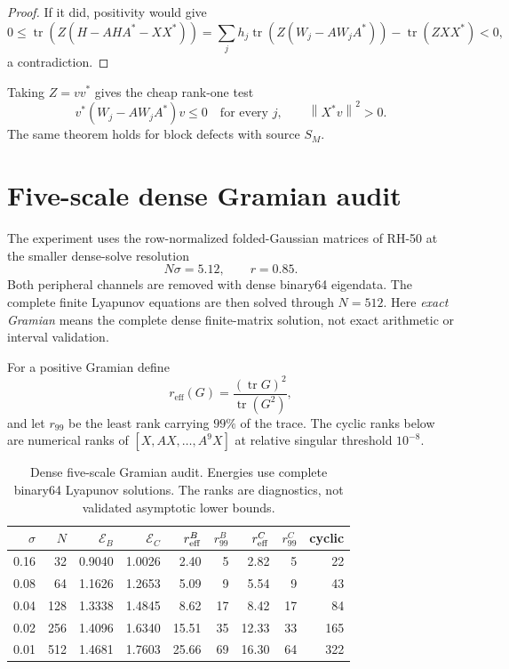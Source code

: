 \documentclass[11pt]{article}
\theoremstyle{definition}
\theoremstyle{remark}
\newcommand{\cE}{\mathcal E}
\newcommand{\tr}{\operatorname{tr}}
\newcommand{\norm}[1]{\left\lVert #1\right\rVert}
\begin{document}
\begin{proof}
If it did, positivity would give
\[
 0\le
 \tr\!\left(Z(H-AHA^*-XX^*)\right)
 =
 \sum_jh_j\tr\!\left(Z(W_j-AW_jA^*)\right)-\tr(ZXX^*)<0,
\]
a contradiction.
\end{proof}

Taking \(Z=vv^*\) gives the cheap rank-one test
\[
 v^*(W_j-AW_jA^*)v\le0\quad\text{for every }j,
 \qquad
 \norm{X^*v}^2>0.
\]
The same theorem holds for block defects with source \(S_M\).

\section{Five-scale dense Gramian audit}

The experiment uses the row-normalized folded-Gaussian matrices of RH-50
at the smaller dense-solve resolution
\[
 N\sigma=5.12,
 \qquad r=0.85.
\]
Both peripheral channels are removed with dense binary64 eigendata.  The
complete finite Lyapunov equations are then solved through \(N=512\).
Here \emph{exact Gramian} means the complete dense finite-matrix solution,
not exact arithmetic or interval validation.

For a positive Gramian define
\[
 r_{\mathrm{eff}}(G)=\frac{(\tr G)^2}{\tr(G^2)},
\]
and let \(r_{99}\) be the least rank carrying \(99\%\) of the trace.  The
cyclic ranks below are numerical ranks of
\([X,AX,\ldots,A^9X]\) at relative singular threshold \(10^{-8}\).

\begin{table}[H]
\centering
\small
\begin{tabular}{@{}rrrrrrrrr@{}}
\toprule
\(\sigma\)&\(N\)&\(\cE_B\)&\(\cE_C\)&\(r_{\rm eff}^B\)&\(r_{99}^B\)&\(r_{\rm eff}^C\)&\(r_{99}^C\)&cyclic\\
\midrule
0.16&32 &0.9040&1.0026&2.40 &5 &2.82 &5 &22\\
0.08&64 &1.1626&1.2653&5.09 &9 &5.54 &9 &43\\
0.04&128&1.3338&1.4845&8.62 &17&8.42 &17&84\\
0.02&256&1.4096&1.6340&15.51&35&12.33&33&165\\
0.01&512&1.4681&1.7603&25.66&69&16.30&64&322\\
\bottomrule
\end{tabular}
\caption{Dense five-scale Gramian audit.  Energies use complete binary64
Lyapunov solutions.  The ranks are diagnostics, not validated asymptotic
lower bounds.}
\label{tab:gramian}
\end{table}
\end{document}
